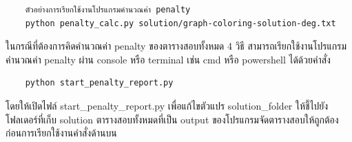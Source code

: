 \begin{verbatim}
    ตัวอย่างการเรียกใช้งานโปรแกรมคำนวณค่า penalty
    python penalty_calc.py solution/graph-coloring-solution-deg.txt
\end{verbatim}

\noindent ในกรณีที่ต้องการคิดคำนวณค่า penalty ของตารางสอบทั้งหมด 4 วิธี สามารถเรียกใช้งานโปรแกรมคำนวณค่า penalty ผ่าน console หรือ terminal เช่น cmd หรือ powershell ได้ด้วยคำสั่ง
\begin{verbatim}
    python start_penalty_report.py
\end{verbatim}
โดยให้เปิดไฟล์ start\_penalty\_report.py เพื่อแก้ไขตัวแปร solution\_folder ให้ชี้ไปยังโฟลเดอร์ที่เก็บ solution ตารางสอบทั้งหมดที่เป็น output ของโปรแกรมจัดตารางสอบให้ถูกต้องก่อนการเรียกใช้งานคำสั่งด้านบน